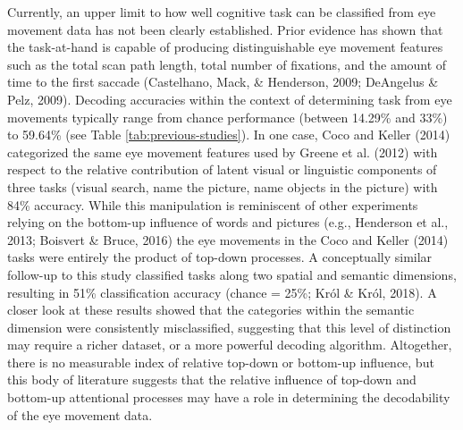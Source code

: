 \documentclass[
  english,
  man,floatsintext]{apa6}
\begin{document}
Currently, an upper limit to how well cognitive task can be classified from eye movement data has not been clearly established. Prior evidence has shown that the task-at-hand is capable of producing distinguishable eye movement features such as the total scan path length, total number of fixations, and the amount of time to the first saccade (Castelhano, Mack, \& Henderson, 2009; DeAngelus \& Pelz, 2009). Decoding accuracies within the context of determining task from eye movements typically range from chance performance (between 14.29\% and 33\%) to 59.64\% (see Table \ref{tab:previous-studies}). In one case, Coco and Keller (2014) categorized the same eye movement features used by Greene et al. (2012) with respect to the relative contribution of latent visual or linguistic components of three tasks (visual search, name the picture, name objects in the picture) with 84\% accuracy. While this manipulation is reminiscent of other experiments relying on the bottom-up influence of words and pictures (e.g., Henderson et al., 2013; Boisvert \& Bruce, 2016) the eye movements in the Coco and Keller (2014) tasks were entirely the product of top-down processes. A conceptually similar follow-up to this study classified tasks along two spatial and semantic dimensions, resulting in 51\% classification accuracy (chance = 25\%; Król \& Król, 2018). A closer look at these results showed that the categories within the semantic dimension were consistently misclassified, suggesting that this level of distinction may require a richer dataset, or a more powerful decoding algorithm. Altogether, there is no measurable index of relative top-down or bottom-up influence, but this body of literature suggests that the relative influence of top-down and bottom-up attentional processes may have a role in determining the decodability of the eye movement data.
\end{document}
